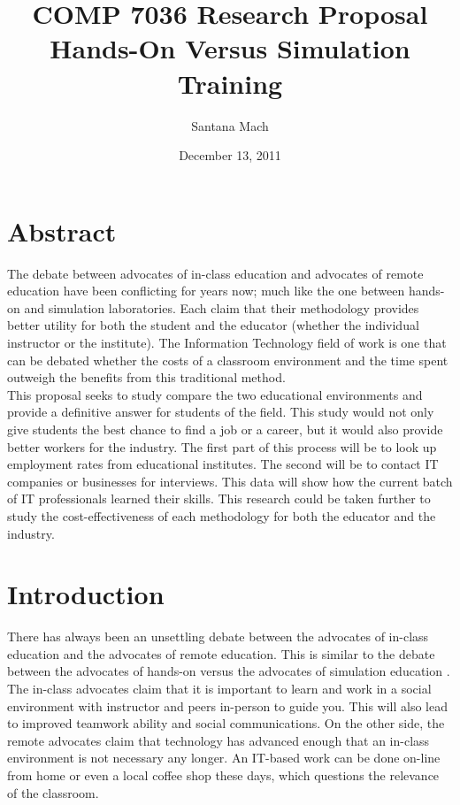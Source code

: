 \documentclass[titlepage]{article}
\begin{document}
\author{Santana Mach}
\title{COMP 7036 Research Proposal \\ Hands-On Versus Simulation Training}
\date{December 13, 2011}
\maketitle{}

\tableofcontents
\pagebreak
\onehalfspacing

\section{Abstract}
The debate between advocates of in-class education and advocates of remote education have
been conflicting for years now; much like the one between hands-on and simulation laboratories.
Each claim that their methodology provides better utility for both the student and the
educator (whether the individual instructor or the institute).  The Information Technology
field of work is one that can be debated whether the costs of a classroom environment
and the time spent outweigh the benefits from this traditional method.\\

\noindent This proposal seeks to study compare the two educational environments and provide a
definitive answer for students of the field.  This study would not only give students the
best chance to find a job or a career, but it would also provide better workers for the
industry.  The first part of this process will be to look up employment rates
from educational institutes.  The second will be to contact IT companies or businesses
for interviews.  This data will show how the current batch of IT professionals learned
their skills.  This research could be taken further to study the cost-effectiveness of
each methodology for both the educator and the industry.

\clearpage

\section{Introduction}

There has always been an unsettling debate between the advocates of in-class education
and the advocates of remote education.  This is similar to the debate between the advocates
of hands-on versus the advocates of simulation education \cite{2}. The in-class advocates claim that
it is important to learn and work in a social environment with instructor and peers in-person
to guide you.  This will also lead to improved teamwork ability and social communications.
On the other side, the remote advocates claim that technology has advanced enough that an
in-class environment is not necessary any longer.  An IT-based work can be done on-line
from home or even a local coffee shop these days, which questions the relevance of the classroom.\\
\end{document}

